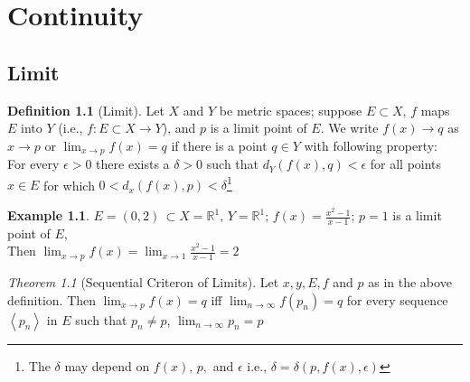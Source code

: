 \documentclass[12pt,oneside,a4paper]{book}
\newcommand{\R}{\mathds{R}}
\newcommand{\seq}[1]{\left<#1\right>}
\theoremstyle{remark}
\newtheorem{thm}{Theorem}[section]
\theoremstyle{definition}
\newtheorem{defn}{Definition}[section]
\newtheorem*{ex}{Example}
\begin{document}
\chapter{Continuity}
\section{Limit}
\begin{defn}[Limit]
    Let $ X $ and $ Y $ be metric spaces; suppose $ E\subset X $, $ f $ maps $ E $ into $ Y $ (i.e., $ f:E\subset X\to Y $), and $ p $ is a limit point of $ E $. We write $ f(x)\to q $ as $ x\to p $ or $ \lim_{x\to p} f(x)=q$ if there is a point $ q\in Y $ with following property:\\
    For every $ \epsilon> 0$ there exists a $ \delta>0 $ such that $ d_Y(f(x),q)<\epsilon $ for all points $ x\in E $ for which $ 0<d_x(f(x),p)<\delta $\footnote{The $ \delta $ may depend on $ f(x),\,p, $ and $ \epsilon $ i.e., $ \delta=\delta(p,f(x),\epsilon) $} 
\end{defn}
\begin{ex}
    $ E=(0,2)\,\subset X=\R^1,\,Y=\R^1;\,f(x)=\frac{x^2-1}{x-1};\, p=1 $ is a limit point of $ E $,\\Then $ \lim_{x\to p} f(x)= \lim_{x\to 1}\frac{x^2-1}{x-1}=2$
\end{ex}
\begin{thm}[Sequential Criteron of Limits]
    Let $ x,y,E,f $ and $ p $ as in the above definition. Then $ \lim_{x\to p} f(x)=q $ iff $ \lim_{n\to \infty} f(p_n)=q $ for every sequence $ \seq{p_n} $ in $ E $ such that $ p_n\neq p $, $ \lim_{n\to \infty} p_n=p $
\end{thm}
\end{document}
